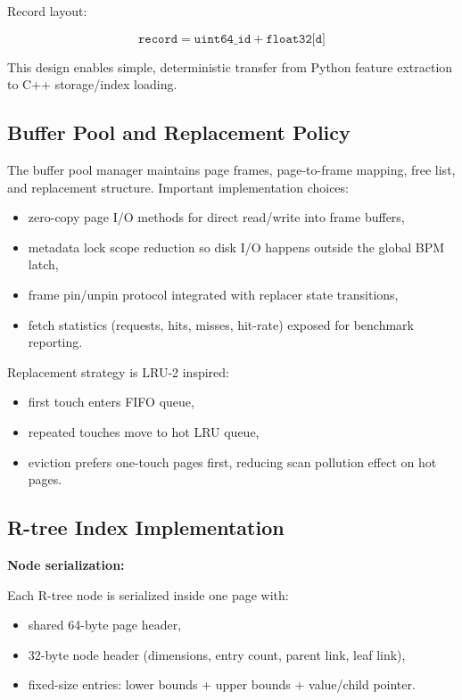 \documentclass[11pt,a4paper]{article}
\begin{document}
Record layout:

\[
\texttt{record} = \texttt{uint64\_id} + \texttt{float32[d]}
\]

This design enables simple, deterministic transfer from Python feature extraction to C++ storage/index loading.

\subsection{Buffer Pool and Replacement Policy}

The buffer pool manager maintains page frames, page-to-frame mapping, free list, and replacement structure. Important implementation choices:

\begin{itemize}[leftmargin=1.5em]
  \item zero-copy page I/O methods for direct read/write into frame buffers,
  \item metadata lock scope reduction so disk I/O happens outside the global BPM latch,
  \item frame pin/unpin protocol integrated with replacer state transitions,
  \item fetch statistics (requests, hits, misses, hit-rate) exposed for benchmark reporting.
\end{itemize}

Replacement strategy is LRU-2 inspired:

\begin{itemize}[leftmargin=1.5em]
  \item first touch enters FIFO queue,
  \item repeated touches move to hot LRU queue,
  \item eviction prefers one-touch pages first, reducing scan pollution effect on hot pages.
\end{itemize}

\subsection{R-tree Index Implementation}

\textbf{Node serialization:}

Each R-tree node is serialized inside one page with:

\begin{itemize}[leftmargin=1.5em]
  \item shared 64-byte page header,
  \item 32-byte node header (dimensions, entry count, parent link, leaf link),
  \item fixed-size entries: lower bounds + upper bounds + value/child pointer.
\end{itemize}
\end{document}
